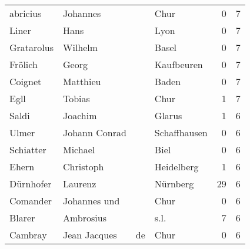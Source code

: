 \documentclass[10pt,a4paper,landscape]{article}
\begin{document}
\begin{longtable}{llllrr}
                 abricius &                           Johannes &             &                                        Chur &          0 &         7 \\
                    Liner &                               Hans &             &                                        Lyon &          0 &         7 \\
               Gratarolus &                            Wilhelm &             &                                       Basel &          0 &         7 \\
                  Frölich &                              Georg &             &                                  Kaufbeuren &          0 &         7 \\
                  Coignet &                           Matthieu &             &                                       Baden &          0 &         7 \\
                     Egll &                             Tobias &             &                                        Chur &          1 &         7 \\
                    Saldi &                            Joachim &             &                                      Glarus &          1 &         6 \\
                    Ulmer &                      Johann Conrad &             &                                Schaffhausen &          0 &         6 \\
                Schiatter &                            Michael &             &                                        Biel &          0 &         6 \\
                    Ehern &                          Christoph &             &                                  Heidelberg &          1 &         6 \\
                Dürnhofer &                            Laurenz &             &                                    Nürnberg &         29 &         6 \\
                 Comander &                       Johannes und &             &                                        Chur &          0 &         6 \\
                   Blarer &                          Ambrosius &             &                                        s.l. &          7 &         6 \\
                  Cambray &                       Jean Jacques &          de &                                        Chur &          0 &         6 \\

\end{longtable}
\end{document}

